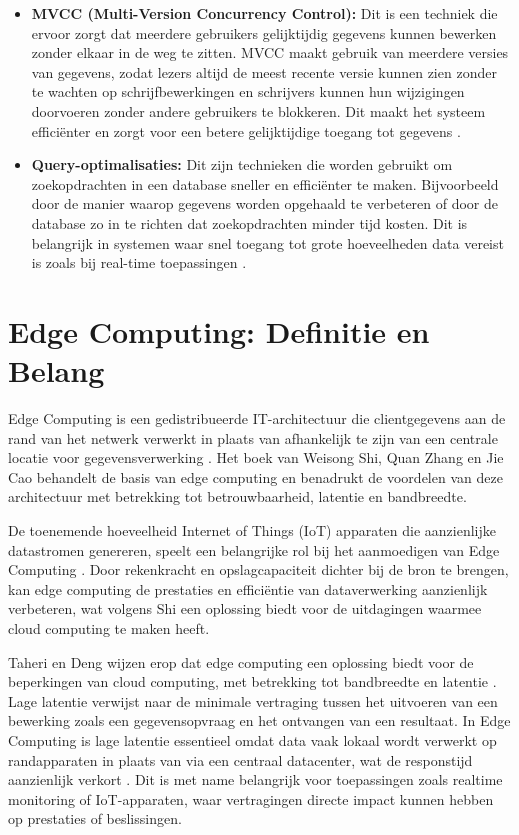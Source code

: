\begin{itemize}
    \item \textbf{MVCC (Multi-Version Concurrency Control):} Dit is een techniek die ervoor zorgt dat meerdere gebruikers gelijktijdig gegevens kunnen bewerken zonder elkaar in de weg te zitten. MVCC maakt gebruik van meerdere versies van gegevens, zodat lezers altijd de meest recente versie kunnen zien zonder te wachten op schrijfbewerkingen en schrijvers kunnen hun wijzigingen doorvoeren zonder andere gebruikers te blokkeren. Dit maakt het systeem efficiënter en zorgt voor een betere gelijktijdige toegang tot gegevens \autocite{Wiseso2020PerformanceAnalysis}.

    \item \textbf{Query-optimalisaties:} Dit zijn technieken die worden gebruikt om zoekopdrachten in een database sneller en efficiënter te maken. Bijvoorbeeld door de manier waarop gegevens worden opgehaald te verbeteren of door de database zo in te richten dat zoekopdrachten minder tijd kosten. Dit is belangrijk in systemen waar snel toegang tot grote hoeveelheden data vereist is zoals bij real-time toepassingen \autocite{Gyorodi2015comparative}.
\end{itemize}

\section{Edge Computing: Definitie en Belang}

Edge Computing is een gedistribueerde IT-architectuur die clientgegevens aan de rand van het netwerk verwerkt in plaats van afhankelijk te zijn van een centrale locatie voor gegevensverwerking \autocite{Shi2018}.
 Het boek van Weisong Shi, Quan Zhang en Jie Cao behandelt de basis van edge computing en benadrukt de voordelen van deze architectuur met betrekking tot betrouwbaarheid, latentie en bandbreedte.

De toenemende hoeveelheid Internet of Things (IoT) apparaten die aanzienlijke datastromen genereren, speelt een belangrijke rol bij het aanmoedigen van Edge Computing \autocite{Shi2016}.
 Door rekenkracht en opslagcapaciteit dichter bij de bron te brengen, kan edge computing de prestaties en efficiëntie van dataverwerking aanzienlijk verbeteren, wat volgens Shi een oplossing biedt voor de uitdagingen waarmee cloud computing te maken heeft.

Taheri en Deng wijzen erop dat edge computing een oplossing biedt voor de beperkingen van cloud computing, met betrekking tot bandbreedte en latentie \autocite{Taheri2020}.
 Lage latentie verwijst naar de minimale vertraging tussen het uitvoeren van een bewerking zoals een gegevensopvraag en het ontvangen van een resultaat. In Edge Computing is lage latentie essentieel omdat data vaak lokaal wordt verwerkt op randapparaten in plaats van via een centraal datacenter, wat de responstijd aanzienlijk verkort \autocite{Taheri2020}. Dit is met name belangrijk voor toepassingen zoals realtime monitoring of IoT-apparaten, waar vertragingen directe impact kunnen hebben op prestaties of beslissingen.

